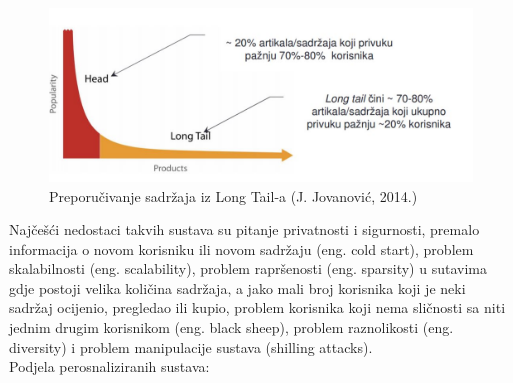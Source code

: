 \documentclass[a4paper,oneside,12pt]{memoir} %
\begin{document}
\begin{figure}[!h]
\begin{center}
\includegraphics[scale=0.6]{slike/long_tail.jpg}
\caption{Preporučivanje sadržaja iz Long Tail-a (J. Jovanović, 2014.)}
\end{center}
\end{figure}
\par 
Najčešći nedostaci takvih sustava su pitanje privatnosti i sigurnosti, premalo informacija o novom korisniku ili novom sadržaju (eng. cold start), problem skalabilnosti (eng. scalability), problem rapršenosti (eng. sparsity) u sutavima gdje postoji velika količina sadržaja, a jako mali broj korisnika koji je neki sadržaj ocijenio, pregledao ili kupio, problem korisnika koji nema sličnosti sa niti jednim drugim korisnikom (eng. black sheep), problem raznolikosti (eng. diversity) i problem manipulacije sustava (shilling attacks).
\bigskip
\\ Podjela perosnaliziranih sustava:
\end{document}
